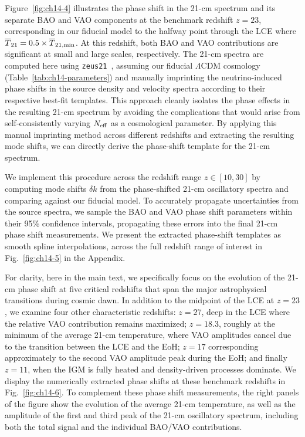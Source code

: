 Figure~\ref{fig:ch14-4} illustrates the phase shift in the 21-cm spectrum and its separate BAO and VAO components at the benchmark redshift $z=23$, corresponding in our fiducial model to the halfway point through the LCE where $\overline{T}_{21}= 0.5 \times \overline{T}_{21,\rm min}$. At this redshift, both BAO and VAO contributions are significant at small and large scales, respectively. The 21-cm spectra are computed here using \texttt{zeus21}~\cite{munoz23,munoz23b,Cruz:2024fsv}, assuming our fiducial $\Lambda$CDM cosmology (Table~\ref{tab:ch14-parameters}) and manually imprinting the neutrino-induced phase shifts in the source density and velocity spectra according to their respective best-fit templates. This approach cleanly isolates the phase effects in the resulting 21-cm spectrum by avoiding the complications that would arise from self-consistently varying $N_{\rm eff}$ as a cosmological parameter. By applying this manual imprinting method across different redshifts and extracting the resulting mode shifts, we can directly derive the phase-shift template for the 21-cm spectrum.

We implement this procedure across the redshift range $z \in [10,30]$ by computing mode shifts $\delta k$ from the phase-shifted 21-cm oscillatory spectra and comparing against our fiducial model. To accurately propagate uncertainties from the source spectra, we sample the BAO and VAO phase shift parameters within their 95\% confidence intervals, propagating these errors into the final 21-cm phase shift measurements. We present the extracted phase-shift templates as smooth spline interpolations, across the full redshift range of interest in Fig.~\ref{fig:ch14-5} in the Appendix.

For clarity, here in the main text, we specifically focus on the evolution of the 21-cm phase shift at five critical redshifts that span the major astrophysical transitions during cosmic dawn. In addition to the midpoint of the LCE at $z=23$, we examine four other characteristic redshifts: $z=27$, deep in the LCE where the relative VAO contribution remains maximized; $z=18.3$, roughly at the minimum of the average 21-cm temperature, where VAO amplitudes cancel due to the transition between the LCE and the EoH; $z=17$ corresponding approximately to the second VAO amplitude peak during the EoH; and finally $z=11$, when the IGM is fully heated and density-driven processes dominate. We display the numerically extracted phase shifts at these benchmark redshifts in Fig.~\ref{fig:ch14-6}. To complement these phase shift measurements, the right panels of the figure show the evolution of the average 21-cm temperature, as well as the amplitude of the first and third peak of the 21-cm oscillatory spectrum, including both the total signal and the individual BAO/VAO contributions.

